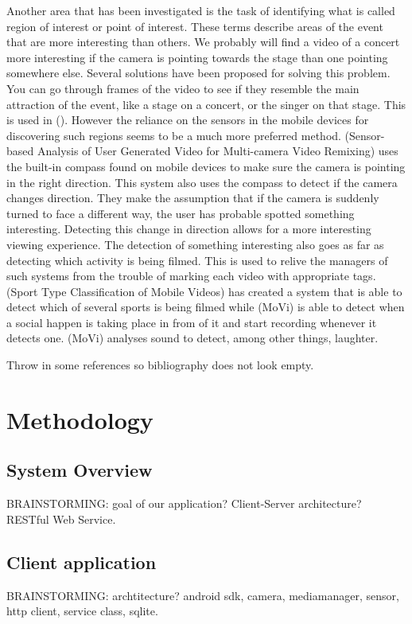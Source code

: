 \documentclass[conference]{IEEEtran}
\begin{document}
Another area that has been investigated is the task of identifying what is called region of interest or point of interest. These terms describe areas of the event that are more interesting than others. We probably will find a video of a concert more interesting if the camera is pointing towards the stage than one pointing somewhere else. Several solutions have been proposed for solving this problem. You can go through frames of the video to see if they resemble the main attraction of the event, like a stage on a concert, or the singer on that stage. This is used in (). However the reliance on the sensors in the mobile devices for discovering such regions seems to be a much more preferred method. (Sensor-based Analysis of User Generated Video for Multi-camera Video Remixing) uses the built-in compass found on mobile devices to make sure the camera is pointing in the right direction. This system also uses the compass to detect if the camera changes direction. They make the assumption that if the camera is suddenly turned to face a different way, the user has probable spotted something interesting. Detecting this change in direction allows for a more interesting viewing experience. 
The detection of something interesting also goes as far as detecting which activity is being filmed.  This is used to relive the managers of such systems from the trouble of marking each video with appropriate tags. (Sport Type Classification of Mobile Videos) has created a system that is able to detect which of several sports is being filmed while (MoVi) is able to detect when a social happen is taking place in from of it and start recording whenever it detects one. (MoVi) analyses sound to detect, among other things, laughter. 


Throw in some references \cite{shrestha_automatic_2010} so bibliography does not look empty.
\cite{seshadri_demand_2014}

\section{Methodology}

\subsection{System Overview}
BRAINSTORMING: goal of our application? Client-Server architecture? RESTful Web Service.

\subsection{Client application}
BRAINSTORMING: archtitecture? android sdk, camera, mediamanager, sensor, http client, service class, sqlite.
\end{document}

